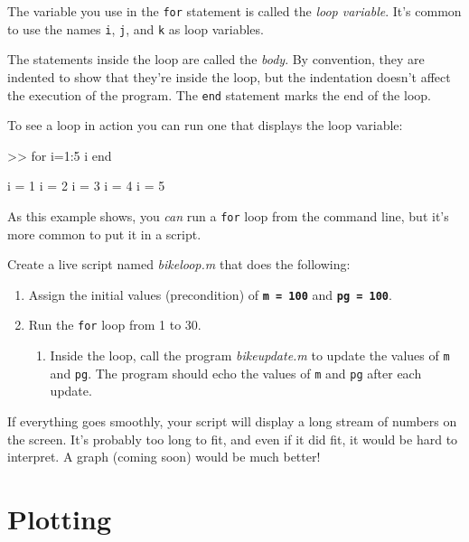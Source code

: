 \documentclass[../../book.tex]{subfiles}
\begin{document}
The variable you use in the \lstinline{for} statement is called the \emph{loop
variable}.  It's common to use the names \lstinline{i},
\lstinline{j}, and \lstinline{k} as loop variables.


The statements inside the loop are called the \emph{body}.  By convention,
they are indented to show that they're inside the loop, but the
indentation doesn't affect the execution of the program.
The \lstinline{end} statement marks the end of the loop.


To see a loop in action you can run one that displays the
loop variable:

\begin{code}
>> for i=1:5
    i
end

i = 1
i = 2
i = 3
i = 4
i = 5
\end{code}

As this example shows, you \emph{can} run a \lstinline{for} loop from the
command line, but it's more common to put it in a script.

\begin{ex}
Create a live script named \emph{bike\textunderscore loop.m} that does the following:
\begin{enumerate}
\item Assign the initial values (precondition) of \textbf{\lstinline{m = 100}} and \textbf{\lstinline{pg = 100}}.
\item Run the \lstinline{for} loop from 1 to 30.
\begin{enumerate}
    \item Inside the loop, call the program \emph{bike\textunderscore update.m} to update the values of \lstinline{m} and \lstinline{pg}.  The program should echo the values of \lstinline{m} and \lstinline{pg} after each update.
\end{enumerate}
\end{enumerate}

If everything goes smoothly, your script will display a long stream
of numbers on the screen.  It's probably too long
to fit, and even if it did fit, it would be hard to interpret.
A graph (coming soon) would be much better!
\end{ex}



\section{Plotting}
\label{plotting}
\end{document}
